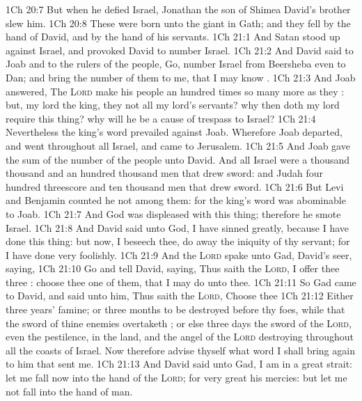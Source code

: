 \vs 1Ch 20:7 But when he defied Israel, Jonathan the son of Shimea David's brother slew him.
\vs 1Ch 20:8 These were born unto the giant in Gath; and they fell by the hand of David, and by the hand of his servants.
\vs 1Ch 21:1 And Satan stood up against Israel, and provoked David to number Israel.
\vs 1Ch 21:2 And David said to Joab and to the rulers of the people, Go, number Israel from Beersheba even to Dan; and bring the number of them to me, that I may know .
\vs 1Ch 21:3 And Joab answered, The \textsc{Lord} make his people an hundred times so many more as they : but, my lord the king,  they not all my lord's servants? why then doth my lord require this thing? why will he be a cause of trespass to Israel?
\vs 1Ch 21:4 Nevertheless the king's word prevailed against Joab. Wherefore Joab departed, and went throughout all Israel, and came to Jerusalem.
\vs 1Ch 21:5 And Joab gave the sum of the number of the people unto David. And all  Israel were a thousand thousand and an hundred thousand men that drew sword: and Judah  four hundred threescore and ten thousand men that drew sword.
\vs 1Ch 21:6 But Levi and Benjamin counted he not among them: for the king's word was abominable to Joab.
\vs 1Ch 21:7 And God was displeased with this thing; therefore he smote Israel.
\vs 1Ch 21:8 And David said unto God, I have sinned greatly, because I have done this thing: but now, I beseech thee, do away the iniquity of thy servant; for I have done very foolishly.
\vs 1Ch 21:9 And the \textsc{Lord} spake unto Gad, David's seer, saying,
\vs 1Ch 21:10 Go and tell David, saying, Thus saith the \textsc{Lord}, I offer thee three : choose thee one of them, that I may do  unto thee.
\vs 1Ch 21:11 So Gad came to David, and said unto him, Thus saith the \textsc{Lord}, Choose thee
\vs 1Ch 21:12 Either three years' famine; or three months to be destroyed before thy foes, while that the sword of thine enemies overtaketh ; or else three days the sword of the \textsc{Lord}, even the pestilence, in the land, and the angel of the \textsc{Lord} destroying throughout all the coasts of Israel. Now therefore advise thyself what word I shall bring again to him that sent me.
\vs 1Ch 21:13 And David said unto Gad, I am in a great strait: let me fall now into the hand of the \textsc{Lord}; for very great  his mercies: but let me not fall into the hand of man.
